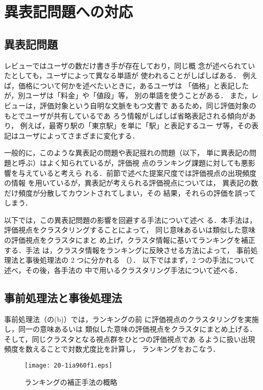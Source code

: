 \documentclass[japanese]{jnlp_1.4}
\def\fig#1{}
\begin{document}
\section{異表記問題への対応}
\label{sec:cl}


\subsection{異表記問題}
\label{sec:clustering_summary}

レビューではユーザの数だけ書き手が存在しており，同じ概
念が述べられていたとしても，ユーザによって異なる単語が
使われることがしばしばある．
例えば，価格について何かを述べたいときに，あるユーザは
「価格」と表記したが，別ユーザは「料金」や「値段」等，
別の単語を使うことがある．
また，レビューは，評価対象という自明な文脈をもつ文書で
あるため，同じ評価対象のもとでユーザが共有しているであ
ろう情報がしばしば省略表記される傾向があり，
例えば，最寄り駅の「東京駅」を単に「駅」と表記するユー
ザ等，その表記はユーザによってさまざまに変化する．

一般的に，このような異表記の問題や表記揺れの問題（以下，
  単に異表記の問題と呼ぶ）はよく知られているが，評価視
点のランキング課題に対しても悪影響を与えていると考えら
れる．前節で述べた提案尺度では評価視点の出現頻度の情報
を用いているが，異表記が考えられる評価視点については，
異表記の数だけ頻度が分散してカウントされてしまい，その
結果，それらの評価を誤ってしまう．

以下では，この異表記問題の影響を回避する手法について述べ
る．本手法は，評価視点をクラスタリングすることによって，
同じ意味あるいは類似した意味の評価視点をクラスタにまと
め上げ，クラスタ情報に基いてランキングを補正する．手法
は，クラスタ情報をランキングに反映させる方法によって，
事前処理法と事後処理法の 2 つに分かれる
（\fig{clustering}）．
以下ではまず，2 つの手法について述べ，その後，各手法の
中で用いるクラスタリング手法について述べる．



\subsection{事前処理法と事後処理法}

事前処理法（\fig{clustering}の(b)）では，ランキングの前
に評価視点のクラスタリングを実施し，同一の意味あるいは
類似した意味の評価視点をクラスタにまとめ上げる．
そして，同じクラスタとなる視点群をひとつの評価視点であ
るように扱い出現頻度を数えることで対数尤度比を計算し，
ランキングをおこなう．

\begin{figure}[t]
 \begin{center}
 \texttt{[image: 20-1ia960f1.eps]}
 \end{center}
 \caption{ランキングの補正手法の概略}
 \label{fig:clustering}
\end{figure}
\end{document}
